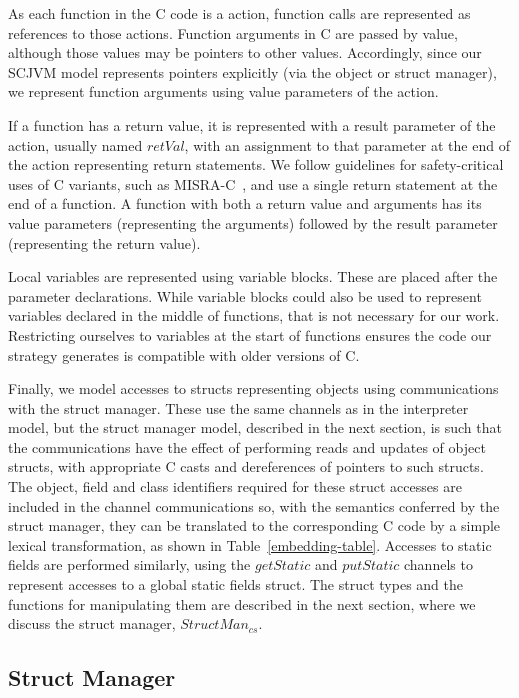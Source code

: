 As each function in the C code is a \Circus{} action, function calls
are represented as references to those actions.
Function arguments in C are passed by value, although those values may
be pointers to other values.
Accordingly, since our SCJVM model represents pointers explicitly (via
the object or struct manager), we represent function arguments using
value parameters of the \Circus{} action.

If a function has a return value, it is represented with a result
parameter of the \Circus{} action, usually named $retVal$, with an
assignment to that parameter at the end of the action representing
return statements.
We follow guidelines for safety-critical uses of C variants, such as
MISRA-C~\cite{MISRA}, and use a single return statement at the end of
a function.
A function with both a return value and arguments has its value
parameters (representing the arguments) followed by the result
parameter (representing the return value).

Local variables are represented using \Circus{} variable blocks.
These are placed after the parameter declarations.
While \Circus{} variable blocks could also be used to represent
variables declared in the middle of functions, that is not necessary
for our work.
Restricting ourselves to variables at the start of functions ensures
the code our strategy generates is compatible with older versions of
C.

Finally, we model accesses to structs representing objects using
communications with the struct manager.
These use the same channels as in the interpreter model, but the
struct manager model, described in the next section, is such that the
communications have the effect of performing reads and updates of
object structs, with appropriate C casts and dereferences of pointers
to such structs.
The object, field and class identifiers required for these struct
accesses are included in the channel communications so, with the
semantics conferred by the struct manager, they can be translated to
the corresponding C code by a simple lexical transformation, as shown
in Table~\ref{embedding-table}.
Accesses to static fields are performed similarly, using the
$getStatic$ and $putStatic$ channels to represent accesses to a global
static fields struct. 
The struct types and the functions for manipulating them are described
in the next section, where we discuss the struct manager,
$StructMan_{cs}$.

\subsection{Struct Manager}
\label{cee-struct-manager-subsection}

